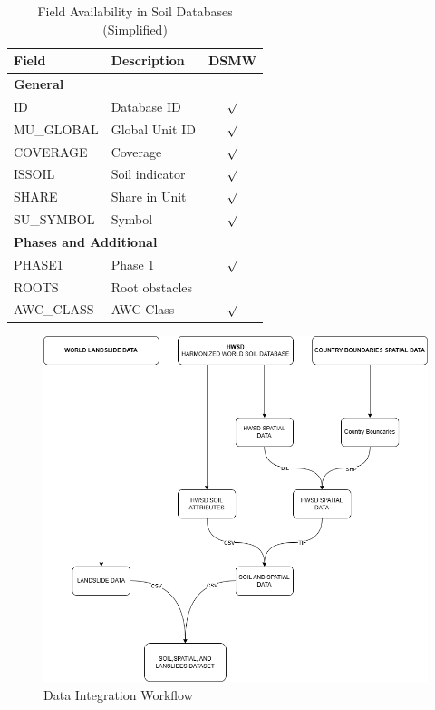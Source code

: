 \begin{table}[H]
\caption{Field Availability in Soil Databases (Simplified)}
\centering
\begin{tabular}{|p{2cm}|p{2.8cm}|c|}
\hline
\textbf{Field} & \textbf{Description} & \textbf{DSMW} \\
\hline
\multicolumn{3}{|l|}{\textbf{General}} \\
\hline
ID & Database ID & $\surd$ \\
MU\_GLOBAL & Global Unit ID & $\surd$ \\
COVERAGE & Coverage & $\surd$ \\
ISSOIL & Soil indicator & $\surd$ \\
SHARE & Share in Unit & $\surd$ \\
SU\_SYMBOL & Symbol & $\surd$ \\
\hline
\multicolumn{3}{|l|}{\textbf{Phases and Additional}} \\
\hline
PHASE1 & Phase 1 & $\surd$ \\
ROOTS & Root obstacles &  \\
AWC\_CLASS & AWC Class & $\surd$ \\
\hline
\end{tabular}
\label{tab:soil_field_availability_small}
\end{table}

\begin{figure}[htbp]
    \centerline{\includegraphics[width=\linewidth]{fig3.png}}
    \caption{Data Integration Workflow}
    \label{fig:data-integration-workflow}
\end{figure}

